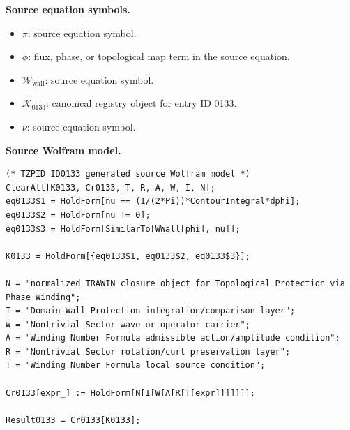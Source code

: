 \begin{minipage}[t]{0.49\linewidth}
\begingroup
\small
\raggedright
\textbf{Source equation symbols.}\par
\begin{itemize}[leftmargin=1.35em,itemsep=1pt,topsep=1pt,parsep=0pt]
    \item $\pi$: source equation symbol.
    \item $\phi$: flux, phase, or topological map term in the source equation.
    \item $\mathcal{W}_{\mathrm{wall}}$: source equation symbol.
    \item $\mathcal{K}_{0133}$: canonical registry object for entry ID 0133.
    \item $\nu$: source equation symbol.
\end{itemize}
\endgroup
\end{minipage}\hfill
\begin{minipage}[t]{0.47\linewidth}
\begingroup
\scriptsize
\raggedright
\textbf{Source Wolfram model.}\par
\begin{Verbatim}[fontsize=\tiny,breaklines=true,breakanywhere=true]
(* TZPID ID0133 generated source Wolfram model *)
ClearAll[K0133, Cr0133, T, R, A, W, I, N];
eq0133$1 = HoldForm[nu == (1/(2*Pi))*ContourIntegral*dphi];
eq0133$2 = HoldForm[nu != 0];
eq0133$3 = HoldForm[SimilarTo[WWall[phi], nu]];

K0133 = HoldForm[{eq0133$1, eq0133$2, eq0133$3}];

N = "normalized TRAWIN closure object for Topological Protection via Phase Winding";
I = "Domain-Wall Protection integration/comparison layer";
W = "Nontrivial Sector wave or operator carrier";
A = "Winding Number Formula admissible action/amplitude condition";
R = "Nontrivial Sector rotation/curl preservation layer";
T = "Winding Number Formula local source condition";

Cr0133[expr_] := HoldForm[N[I[W[A[R[T[expr]]]]]]];

Result0133 = Cr0133[K0133];
\end{Verbatim}
\endgroup
\end{minipage}

